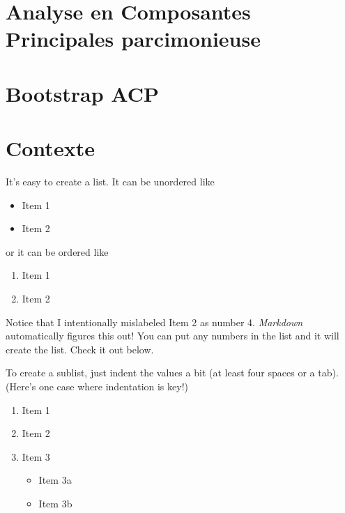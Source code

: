 \documentclass[12pt,twoside]{reedthesis}
\providecommand{\tightlist}{%
  \setlength{\itemsep}{0pt}\setlength{\parskip}{0pt}}
\theoremstyle{definition}
\theoremstyle{definition}
\theoremstyle{remark}
\begin{document}
  \section{Analyse en Composantes Principales
  parcimonieuse}\label{analyse-en-composantes-principales-parcimonieuse}
  
  \section{Bootstrap ACP}\label{bootstrap-acp}
  
  \section{Contexte}\label{contexte}
  
  It's easy to create a list. It can be unordered like
  
  \begin{itemize}
  \tightlist
  \item
    Item 1
  \item
    Item 2
  \end{itemize}
  
  or it can be ordered like
  
  \begin{enumerate}
  \def\labelenumi{\arabic{enumi}.}
  \tightlist
  \item
    Item 1
  \item
    Item 2
  \end{enumerate}
  
  Notice that I intentionally mislabeled Item 2 as number 4.
  \emph{Markdown} automatically figures this out! You can put any numbers
  in the list and it will create the list. Check it out below.
  
  To create a sublist, just indent the values a bit (at least four spaces
  or a tab). (Here's one case where indentation is key!)
  
  \begin{enumerate}
  \def\labelenumi{\arabic{enumi}.}
  \tightlist
  \item
    Item 1
  \item
    Item 2
  \item
    Item 3
  
    \begin{itemize}
    \tightlist
    \item
      Item 3a
    \item
      Item 3b
    \end{itemize}
  \end{enumerate}
  
\end{document}
